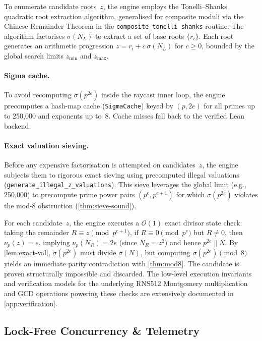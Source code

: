 To enumerate candidate roots~$z$, the engine employs the
Tonelli--Shanks quadratic root extraction algorithm, generalised for
composite moduli via the Chinese Remainder Theorem in the
\texttt{composite\_\allowbreak{}tonelli\_\allowbreak{}shanks} routine.
The algorithm factorises $\sigma(N_L)$ to extract a set of base roots
$\{r_i\}$.  Each root generates an arithmetic progression
$z = r_i + c\,\sigma(N_L)$ for $c \ge 0$, bounded by the global
search limits $z_{\min}$ and $z_{\max}$.

\paragraph{Sigma cache.}
To avoid recomputing $\sigma(p^{2e})$ inside the raycast inner loop,
the engine precomputes a hash-map cache (\texttt{SigmaCache}) keyed by
$(p, 2e)$ for all primes up to 250{,}000 and exponents up to~8.  Cache
misses fall back to the verified Lean backend.

\paragraph{Exact valuation sieving.}
Before any expensive factorisation is attempted on candidates~$z$, the
engine subjects them to rigorous exact sieving using precomputed
illegal valuations
(\texttt{generate\_\allowbreak{}illegal\_\allowbreak{}z\_\allowbreak{}valuations}).
This sieve leverages the global limit (e.g., 250{,}000) to precompute prime power pairs $(p^e, p^{e+1})$ for which
$\sigma(p^{2e})$ violates the mod-8 obstruction
(\cref{thm:sieve-sound}).

For each candidate~$z$, the engine executes a $\mathcal{O}(1)$ exact
divisor state check: taking the remainder
$R \equiv z \pmod{p^{e+1}}$, if $R \equiv 0 \pmod{p^e}$ but
$R \neq 0$, then $\nu_p(z) = e$, implying $\nu_p(N_R) = 2e$ (since
$N_R = z^2$) and hence $p^{2e} \parallel N$.  By
\cref{lem:exact-val}, $\sigma(p^{2e})$ must divide $\sigma(N)$, but
computing $\sigma(p^{2e}) \pmod{8}$ yields an immediate parity
contradiction with \cref{thm:mod8}.  The candidate is proven
structurally impossible and discarded. The low-level execution invariants and verification models for the underlying RNS512 Montgomery multiplication and GCD operations powering these checks are extensively documented in \cref{app:verification}.


\subsection{Lock-Free Concurrency \& Telemetry}
\label{subsec:concurrency_telemetry}

